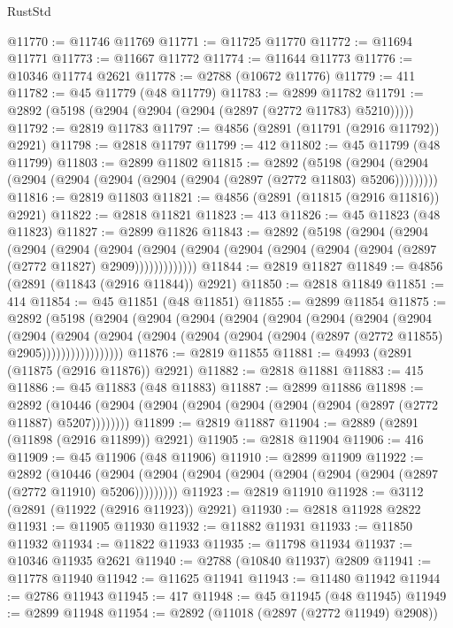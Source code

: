 \begin{lexlean}{RustStd}
\begin{coremodule}
@11770 := @11746 @11769
@11771 := @11725 @11770
@11772 := @11694 @11771
@11773 := @11667 @11772
@11774 := @11644 @11773
@11776 := @10346 @11774 @2621
@11778 := @2788 (@10672 @11776)
@11779 := 411
@11782 := @45 @11779 (@48 @11779)
@11783 := @2899 @11782
@11791 := @2892 (@5198 (@2904 (@2904 (@2904 (@2897 (@2772 @11783) @5210)))))
@11792 := @2819 @11783
@11797 := @4856 (@2891 (@11791 (@2916 @11792)) @2921)
@11798 := @2818 @11797
@11799 := 412
@11802 := @45 @11799 (@48 @11799)
@11803 := @2899 @11802
@11815 := @2892
    (@5198 (@2904 (@2904 (@2904 (@2904 (@2904 (@2904 (@2904 (@2897 (@2772 @11803) @5206)))))))))
@11816 := @2819 @11803
@11821 := @4856 (@2891 (@11815 (@2916 @11816)) @2921)
@11822 := @2818 @11821
@11823 := 413
@11826 := @45 @11823 (@48 @11823)
@11827 := @2899 @11826
@11843 := @2892
    (@5198
      (@2904
        (@2904
          (@2904
            (@2904
              (@2904
                (@2904 (@2904 (@2904 (@2904 (@2904 (@2904 (@2897 (@2772 @11827) @2909)))))))))))))
@11844 := @2819 @11827
@11849 := @4856 (@2891 (@11843 (@2916 @11844)) @2921)
@11850 := @2818 @11849
@11851 := 414
@11854 := @45 @11851 (@48 @11851)
@11855 := @2899 @11854
@11875 := @2892
    (@5198
      (@2904
        (@2904
          (@2904
            (@2904
              (@2904
                (@2904
                  (@2904
                    (@2904
                      (@2904
                        (@2904
                          (@2904
                            (@2904 (@2904 (@2904 (@2904 (@2897 (@2772 @11855) @2905)))))))))))))))))
@11876 := @2819 @11855
@11881 := @4993 (@2891 (@11875 (@2916 @11876)) @2921)
@11882 := @2818 @11881
@11883 := 415
@11886 := @45 @11883 (@48 @11883)
@11887 := @2899 @11886
@11898 := @2892
    (@10446 (@2904 (@2904 (@2904 (@2904 (@2904 (@2904 (@2897 (@2772 @11887) @5207))))))))
@11899 := @2819 @11887
@11904 := @2889 (@2891 (@11898 (@2916 @11899)) @2921)
@11905 := @2818 @11904
@11906 := 416
@11909 := @45 @11906 (@48 @11906)
@11910 := @2899 @11909
@11922 := @2892
    (@10446 (@2904 (@2904 (@2904 (@2904 (@2904 (@2904 (@2904 (@2897 (@2772 @11910) @5206)))))))))
@11923 := @2819 @11910
@11928 := @3112 (@2891 (@11922 (@2916 @11923)) @2921)
@11930 := @2818 @11928 @2822
@11931 := @11905 @11930
@11932 := @11882 @11931
@11933 := @11850 @11932
@11934 := @11822 @11933
@11935 := @11798 @11934
@11937 := @10346 @11935 @2621
@11940 := @2788 (@10840 @11937) @2809
@11941 := @11778 @11940
@11942 := @11625 @11941
@11943 := @11480 @11942
@11944 := @2786 @11943
@11945 := 417
@11948 := @45 @11945 (@48 @11945)
@11949 := @2899 @11948
@11954 := @2892 (@11018 (@2897 (@2772 @11949) @2908))

\end{coremodule}
\end{lexlean}
